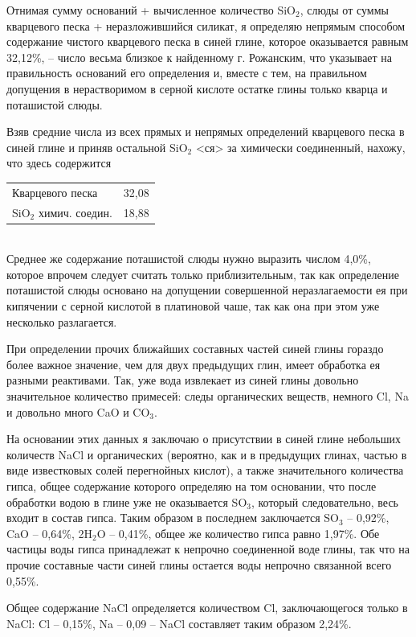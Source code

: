 Отнимая сумму оснований + вычисленное количество SiO$_2$, слюды от суммы кварцевого песка + неразложившийся силикат, я определяю непрямым способом содержание чистого кварцевого песка в синей глине, которое оказывается равным 32,12\%, – число весьма близкое к найденному г. Рожанским, что указывает на правильность оснований его определения и, вместе с тем, на правильном допущения в нерастворимом в серной кислоте остатке глины только кварца и поташистой слюды.

Взяв средние числа из всех прямых и непрямых определений кварцевого песка в синей глине и приняв остальной SiO$_2$ <ся>  за химически соединенный, нахожу, что здесь содержится\\ 

\begin{tabular}{| l | l |}
\hline
Кварцевого песка & 32,08 \\
SiO$_2$ химич. соедин. & 18,88 \\
\hline
\end{tabular}\\

Среднее же содержание поташистой слюды нужно выразить числом 4,0\%, которое впрочем следует считать только приблизительным, так как определение поташистой слюды основано на допущении совершенной неразлагаемости ея при кипячении с серной кислотой в платиновой чаше, так как она при этом уже несколько разлагается.

При определении прочих ближайших составных частей синей глины гораздо более важное значение, чем для двух предыдущих глин, имеет обработка ея разными реактивами. Так, уже вода извлекает из синей глины довольно значительное количество примесей: следы органических веществ, немного Cl, Na и довольно много CaO и CO$_3$.

На основании этих данных я заключаю о присутствии в синей глине небольших количеств NaCl и органических (вероятно, как и в предыдущих глинах, частью в виде известковых солей перегнойных кислот), а также значительного количества гипса, общее содержание которого определяю на том основании, что после обработки водою в глине уже не оказывается SO$_3$, который следовательно, весь входит в состав гипса. Таким образом в последнем заключается SO$_3$ – 0,92\%, CaO – 0,64\%, 2H$_2$O – 0,41\%, общее же количество гипса равно 1,97\%. Обе частицы воды гипса принадлежат к непрочно соединенной воде глины, так что на прочие составные части синей глины остается воды непрочно связанной всего 0,55\%.

Общее содержание NaCl определяется количеством Cl, заключающегося только в NaCl: Cl – 0,15\%, Na – 0,09 – NaCl составляет таким образом 2,24\%.

